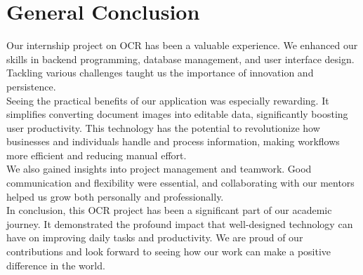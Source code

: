 \chapter*{General Conclusion}
Our internship project on OCR has been a valuable experience. We enhanced our skills in backend programming, database management, and user interface design. Tackling various challenges taught us the importance of innovation and persistence.\\

Seeing the practical benefits of our application was especially rewarding. It simplifies converting document images into editable data, significantly boosting user productivity. This technology has the potential to revolutionize how businesses and individuals handle and process information, making workflows more efficient and reducing manual effort.\\

We also gained insights into project management and teamwork. Good communication and flexibility were essential, and collaborating with our mentors helped us grow both personally and professionally.\\

In conclusion, this OCR project has been a significant part of our academic journey. It demonstrated the profound impact that well-designed technology can have on improving daily tasks and productivity. We are proud of our contributions and look forward to seeing how our work can make a positive difference in the world.